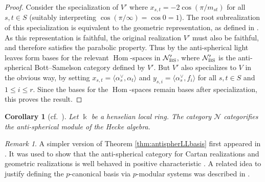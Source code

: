 \documentclass{amsart}
\theoremstyle{plain}
\newtheorem{cor}[thm]{Corollary}
\theoremstyle{definition}
\theoremstyle{remark}
\newtheorem{rem}[thm]{Remark}
\numberwithin{equation}{section}
\DeclareMathOperator{\Hom}{Hom}
\begin{document}
\begin{proof}
Consider the specialization of $V'$ where $x_{s,t}=-2\cos(\pi/m_{st})$ for all $s,t \in S$ (suitably interpreting $\cos(\pi/\infty)=\cos 0=1$). 
The root subrealization of this specialization is equivalent to the geometric representation, as defined in \cite[\S 5.3]{humphreys}. 
As this representation is faithful, the original realization $V'$ must also be faithful, and therefore satisfies the parabolic property. 
Thus by \cite[Theorem~5.3]{LW-antispher} the anti-spherical light leaves form bases for the relevant $\Hom$-spaces in $\mathcal{N}'_{\rm BS}$, where $\mathcal{N}'_{\rm BS}$ is the anti-spherical Bott--Samelson category defined by $V'$. 
But $V'$ also specializes to $V$ in the obvious way, by setting $x_{s,t}=\langle \alpha_s^\vee,\alpha_t\rangle$ and $y_{s,i}=\langle \alpha_s^\vee,f_i\rangle$ for all $s,t \in S$ and $1 \leq i \leq r$. 
Since the bases for the $\Hom$-spaces remain bases after specialization, this proves the result.
\end{proof}

\begin{cor}[{cf.~\cite[Theorem~6.2]{LW-antispher}}] \label{cor:antispherSoergelcatthm}
Let $\Bbbk$ be a henselian local ring. 
The category $\mathcal{N}$ categorifies the anti-spherical module of the Hecke algebra. 
\end{cor}

\begin{rem}
A simpler version of Theorem \ref{thm:antispherLLbasis} first appeared in \cite[Theorem~1.10]{BHN-modularWeylKac}. 
It was used to show that the anti-spherical category for Cartan realizations and geometric realizations is well behaved in positive characteristic \cite[Example~1.11]{BHN-modularWeylKac}. 
A related idea to justify defining the $p$-canonical basis via $p$-modular systems was described in \cite[\S 3.3]{gjw-calcpcanbasis}.
\end{rem}
\end{document}
